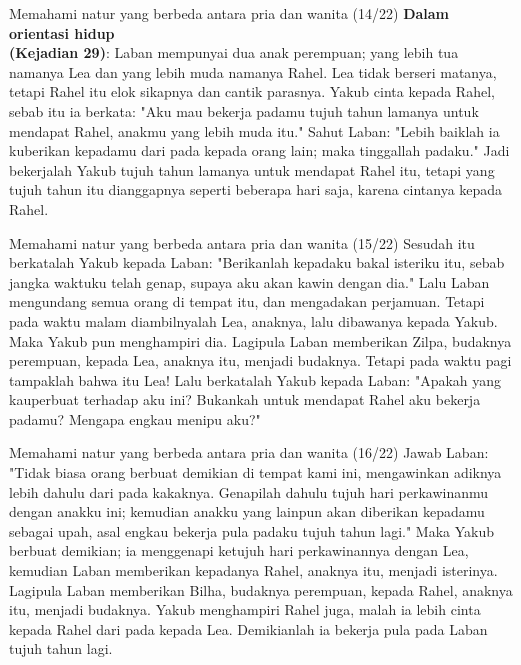 \documentclass{beamer}
\theoremstyle{mystyle}
\let\emph\relax %
\begin{document}
\begin{frame}{Memahami natur yang berbeda antara pria dan wanita (14/22)}
	\textbf{Dalam orientasi hidup}\\
	\emph{Yakub} \textbf{(Kejadian 29)}: Laban mempunyai dua anak perempuan; yang lebih tua namanya Lea dan yang lebih muda namanya Rahel. Lea tidak berseri matanya, tetapi Rahel itu elok sikapnya dan cantik parasnya. Yakub cinta kepada Rahel, sebab itu ia berkata: "Aku mau bekerja padamu tujuh tahun lamanya untuk mendapat Rahel, anakmu yang lebih muda itu." Sahut Laban: "Lebih baiklah ia kuberikan kepadamu dari pada kepada orang lain; maka tinggallah padaku." Jadi bekerjalah Yakub tujuh tahun lamanya untuk mendapat Rahel itu, tetapi yang tujuh tahun itu dianggapnya seperti beberapa hari saja, karena cintanya kepada Rahel. 
\end{frame}

\begin{frame}{Memahami natur yang berbeda antara pria dan wanita (15/22)}
	Sesudah itu berkatalah Yakub kepada Laban: "Berikanlah kepadaku bakal isteriku itu, sebab jangka waktuku telah genap, supaya aku akan kawin dengan dia." Lalu Laban mengundang semua orang di tempat itu, dan mengadakan perjamuan. Tetapi pada waktu malam diambilnyalah Lea, anaknya, lalu dibawanya kepada Yakub. Maka Yakub pun menghampiri dia. Lagipula Laban memberikan Zilpa, budaknya perempuan, kepada Lea, anaknya itu, menjadi budaknya. Tetapi pada waktu pagi tampaklah bahwa itu Lea! Lalu berkatalah Yakub kepada Laban: "Apakah yang kauperbuat terhadap aku ini? Bukankah untuk mendapat Rahel aku bekerja padamu? Mengapa engkau menipu aku?" 
\end{frame}

\begin{frame}{Memahami natur yang berbeda antara pria dan wanita (16/22)}
	Jawab Laban: "Tidak biasa orang berbuat demikian di tempat kami ini, mengawinkan adiknya lebih dahulu dari pada kakaknya. Genapilah dahulu tujuh hari perkawinanmu dengan anakku ini; kemudian anakku yang lainpun akan diberikan kepadamu sebagai upah, asal engkau bekerja pula padaku tujuh tahun lagi." Maka Yakub berbuat demikian; ia menggenapi ketujuh hari perkawinannya dengan Lea, kemudian Laban memberikan kepadanya Rahel, anaknya itu, menjadi isterinya. Lagipula Laban memberikan Bilha, budaknya perempuan, kepada Rahel, anaknya itu, menjadi budaknya. Yakub menghampiri Rahel juga, malah ia lebih cinta kepada Rahel dari pada kepada Lea. Demikianlah ia bekerja pula pada Laban tujuh tahun lagi.
\end{frame}
\end{document}
